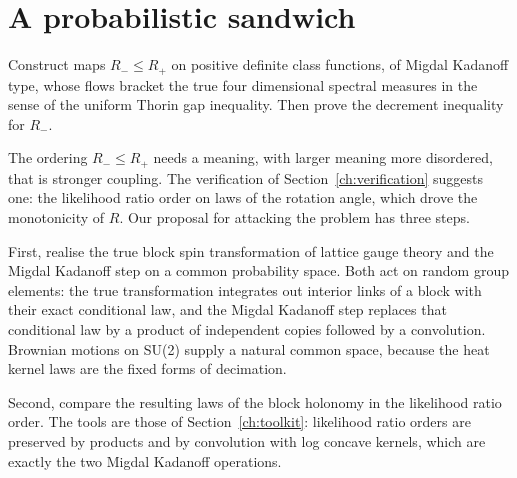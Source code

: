 \section{A probabilistic sandwich}

\begin{problem}\label{op:sandwichB}
Construct maps $R_-\le R_+$ on positive definite class functions, of Migdal Kadanoff type, whose flows bracket the true four dimensional spectral measures in the sense of the uniform Thorin gap inequality. Then prove the decrement inequality for $R_-$.
\end{problem}

The ordering $R_-\le R_+$ needs a meaning, with larger meaning more disordered, that is stronger coupling. The verification of Section~\ref{ch:verification} suggests one: the likelihood ratio order on laws of the rotation angle, which drove the monotonicity of $R$. Our proposal for attacking the problem has three steps.

First, realise the true block spin transformation of lattice gauge theory and the Migdal Kadanoff step on a common probability space. Both act on random group elements: the true transformation integrates out interior links of a block with their exact conditional law, and the Migdal Kadanoff step replaces that conditional law by a product of independent copies followed by a convolution. Brownian motions on SU(2) supply a natural common space, because the heat kernel laws are the fixed forms of decimation.

Second, compare the resulting laws of the block holonomy in the likelihood ratio order. The tools are those of Section~\ref{ch:toolkit}: likelihood ratio orders are preserved by products and by convolution with log concave kernels, which are exactly the two Migdal Kadanoff operations.

